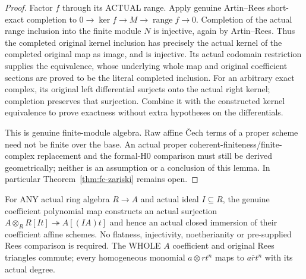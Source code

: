 \begin{proof}
Factor $f$ through its ACTUAL range. Apply genuine Artin--Rees short-exact completion to
$0\to\ker f\to M\to\operatorname{range} f\to0$. Completion of the actual range inclusion
into the finite module $N$ is injective, again by Artin--Rees. Thus the completed original
kernel inclusion has precisely the actual kernel of the completed original map as image,
and is injective. Its actual codomain restriction supplies the equivalence, whose underlying
whole map and original coefficient sections are proved to be the literal completed inclusion.
For an arbitrary exact complex, its original left differential surjects onto the actual right
kernel; completion preserves that surjection. Combine it with the constructed kernel
equivalence to prove exactness without extra hypotheses on the differentials.

This is genuine finite-module algebra. Raw affine \v Cech terms of a proper scheme need not
be finite over the base. An actual proper coherent-finiteness/finite-complex replacement and
the formal-H0 comparison must still be derived geometrically; neither is an assumption or a
conclusion of this lemma. In particular Theorem~\ref{thm:fc-zariski} remains open.
\end{proof}

\begin{lemma}\label{lem:fc-rees-ideal-base-change}
\leanok
{}
For ANY actual ring algebra $R\to A$ and actual ideal $I\subseteq R$, the genuine coefficient
polynomial map constructs an actual surjection
$A\otimes_R R[It]\twoheadrightarrow A[(IA)t]$ and hence an actual closed immersion of their
coefficient affine schemes. No flatness, injectivity, noetherianity or pre-supplied Rees
comparison is required. The WHOLE $A$ coefficient and original Rees triangles commute;
every homogeneous monomial $a\otimes rt^n$ maps to $a\overline r t^n$ with its actual degree.
\end{lemma}

